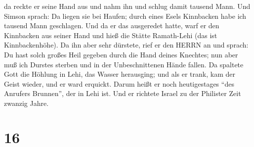 da reckte er seine Hand aus und nahm ihn und schlug damit tausend Mann.
 Und Simson sprach: Da liegen sie bei Haufen; durch eines
Esels Kinnbacken habe ich tausend Mann geschlagen.  Und da
er das ausgeredet hatte, warf er den Kinnbacken aus seiner Hand und hieß
die Stätte Ramath-Lehi (das ist Kinnbackenhöhe).  Da ihn
aber sehr dürstete, rief er den HERRN an und sprach: Du hast solch
großes Heil gegeben durch die Hand deines Knechtes; nun aber muß ich
Durstes sterben und in der Unbeschnittenen Hände fallen. 
Da spaltete Gott die Höhlung in Lehi, das Wasser herausging; und als er
trank, kam der Geist wieder, und er ward erquickt. Darum heißt er noch
heutigestages ``des Anrufers Brunnen'', der in Lehi ist. 
Und er richtete Israel zu der Philister Zeit zwanzig Jahre.

\hypertarget{section-15}{%
\section{16}\label{section-15}}

